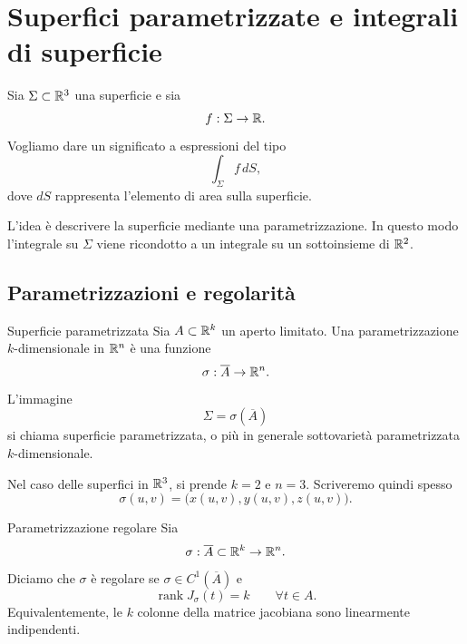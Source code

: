 \documentclass[a4paper]{article}
\begin{document}
\section{Superfici parametrizzate e integrali di superficie}

\begin{radioactive}
Sia \(\Sigma\subset\mathbb{R}^3\) una superficie e sia
\[
    f:\Sigma\to\mathbb{R}.
\]
Vogliamo dare un significato a espressioni del tipo
\[
    \int_\Sigma f\,dS,
\]
dove \(dS\) rappresenta l'elemento di area sulla superficie.
\end{radioactive}

\begin{radioactive}
L'idea è descrivere la superficie mediante una parametrizzazione. In questo modo l'integrale su
\(\Sigma\) viene ricondotto a un integrale su un sottoinsieme di \(\mathbb{R}^2\).
\end{radioactive}

\subsection{Parametrizzazioni e regolarità}

\begin{radioactive}
\begin{snippetdefinition}{Superficie parametrizzata}
    Sia \(A\subset\mathbb{R}^k\) un aperto limitato. Una parametrizzazione \(k\)-dimensionale in
    \(\mathbb{R}^n\) è una funzione
    \[
        \sigma:\overline{A}\to\mathbb{R}^n.
    \]
    L'immagine
    \[
        \Sigma=\sigma(\overline{A})
    \]
    si chiama superficie parametrizzata, o più in generale sottovarietà parametrizzata
    \(k\)-dimensionale.
\end{snippetdefinition}
\end{radioactive}

\begin{radioactive}
Nel caso delle superfici in \(\mathbb{R}^3\), si prende \(k=2\) e \(n=3\). Scriveremo quindi
spesso
\[
    \sigma(u,v)=\bigl(x(u,v),y(u,v),z(u,v)\bigr).
\]
\end{radioactive}

\begin{radioactive}
\begin{snippetdefinition}{Parametrizzazione regolare}
    Sia
    \[
        \sigma:\overline{A}\subset\mathbb{R}^k\to\mathbb{R}^n.
    \]
    Diciamo che \(\sigma\) è regolare se \(\sigma\in C^1(\overline{A})\) e
    \[
        \operatorname{rank} J_\sigma(t)=k
        \qquad \forall t\in A.
    \]
    Equivalentemente, le \(k\) colonne della matrice jacobiana sono linearmente indipendenti.
\end{snippetdefinition}
\end{radioactive}
\end{document}
